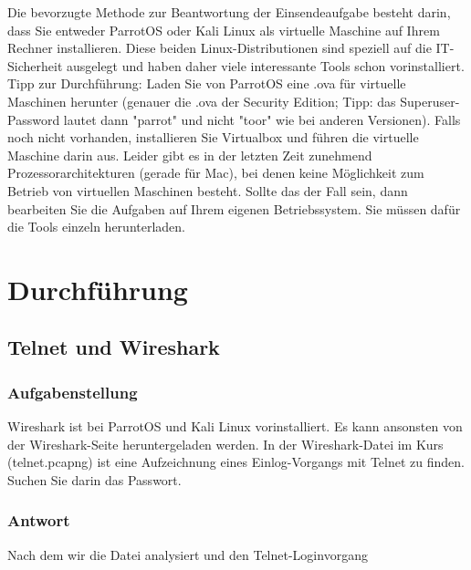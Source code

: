 \documentclass{article}
\begin{document}
Die bevorzugte Methode zur Beantwortung der Einsendeaufgabe besteht darin, dass Sie 
entweder ParrotOS oder Kali Linux als virtuelle Maschine auf Ihrem Rechner installieren. 
Diese beiden Linux-Distributionen sind speziell auf die IT-Sicherheit ausgelegt und haben 
daher viele interessante Tools schon vorinstalliert. 
Tipp zur Durchführung: Laden Sie von ParrotOS  eine .ova für virtuelle Maschinen herunter 
(genauer die .ova der Security Edition; Tipp: das Superuser-Password lautet dann "parrot" 
und nicht "toor" wie bei anderen Versionen). Falls noch nicht vorhanden, installieren Sie 
Virtualbox  und führen die virtuelle Maschine darin aus.
Leider gibt es in der letzten Zeit zunehmend Prozessorarchitekturen (gerade für Mac), bei 
denen keine Möglichkeit zum Betrieb von virtuellen Maschinen besteht. Sollte das der Fall 
sein, dann bearbeiten Sie die Aufgaben auf Ihrem eigenen Betriebssystem. Sie müssen dafür 
die Tools einzeln herunterladen.

\newpage

\section{Durchführung}

\subsection{Telnet und Wireshark}

\subsubsection*{Aufgabenstellung}

Wireshark ist bei ParrotOS und Kali Linux vorinstalliert. Es kann ansonsten von der 
Wireshark-Seite heruntergeladen werden. In der Wireshark-Datei im Kurs (telnet.pcapng) ist 
eine Aufzeichnung eines Einlog-Vorgangs mit Telnet zu finden. Suchen Sie darin das 
Passwort.

\subsubsection*{Antwort}

Nach dem wir die Datei analysiert und den Telnet-Loginvorgang 

%
\end{document}

